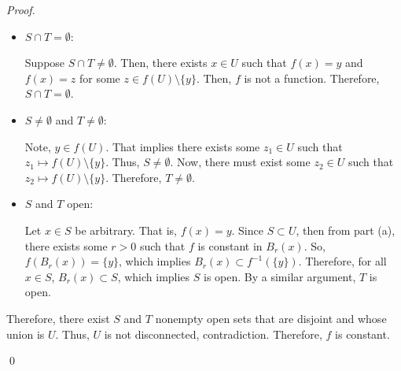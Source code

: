 \documentclass[12pt]{article}
\newenvironment{problem}[2][Problem]{\begin{trivlist}
\item[\hskip \labelsep {\bfseries #1}\hskip \labelsep {\bfseries
#2.}]}{\end{trivlist}}
\newenvironment{sol}
    {\emph{Proof.}
    }
    {
    \qed
    }
\begin{document}
\begin{problem}{14}
\begin{itemize}
\begin{sol}
\begin{itemize}
           \item[(ii)] $S \cap T = \emptyset$:
           
           Suppose $S \cap T \neq \emptyset$. Then, there exists $x \in U$ such that $f(x) = y$ and $f(x) = z$ for some $z \in f(U) \setminus \{y\}$. Then, $f$ is not a function. Therefore, $S \cap T = \emptyset$.
           
           \item[(iii)] $S \neq \emptyset$ and $T \neq \emptyset$:
           
           Note, $y \in f(U)$. That implies there exists some $z_1 \in U$ such that $z_1 \mapsto f(U) \setminus \{y\}$. Thus, $S \neq \emptyset$. Now, there must exist some $z_2 \in U$ such that $z_2 \mapsto f(U) \setminus \{y\}$. Therefore, $T \neq \emptyset$. 
           
           \item[(iv)] $S$ and $T$ open:
           
           Let $x \in S$ be arbitrary. That is, $f(x) = y$. Since $S \subset U$, then from part (a), there exists some $r > 0$ such that $f$ is constant in $B_r(x)$. So, $f(B_r(x)) = \{y\}$, which implies $B_r(x) \subset f^{-1}(\{y\})$. Therefore, for all $x \in S$, $B_r(x) \subset S$, which implies $S$ is open. By a similar argument, $T$ is open.
       \end{itemize}
      Therefore, there exist $S$ and $T$ nonempty open sets that are disjoint and whose union is $U$. Thus, $U$ is not disconnected, contradiction. Therefore, $f$ is constant.
      \end{sol}
  \end{itemize}
  \end{problem}
  
  
  
\end{document}
